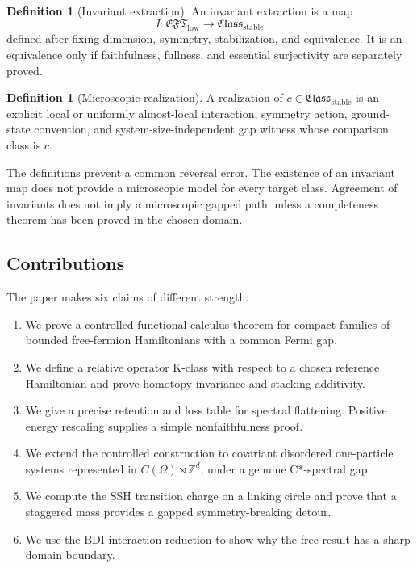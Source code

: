 \documentclass[12pt]{article}
\theoremstyle{definition}
\newtheorem{definition}[theorem]{Definition}
\theoremstyle{remark}
\newcommand{\EFT}{\mathfrak{EFT}}
\newcommand{\Class}{\mathfrak{Class}}
\newcommand{\Z}{\mathbb Z}
\begin{document}
\begin{definition}[Invariant extraction]
An invariant extraction is a map
\[
I:\EFT_{\mathrm{low}}\longrightarrow\Class_{\mathrm{stable}}
\]
defined after fixing dimension, symmetry, stabilization, and equivalence.
It is an equivalence only if faithfulness, fullness, and essential
surjectivity are separately proved.
\end{definition}

\begin{definition}[Microscopic realization]
A realization of $c\in\Class_{\mathrm{stable}}$ is an explicit local or
uniformly almost-local interaction, symmetry action, ground-state convention,
and system-size-independent gap witness whose comparison class is $c$.
\end{definition}

The definitions prevent a common reversal error.
The existence of an invariant map does not provide a microscopic model for
every target class.
Agreement of invariants does not imply a microscopic gapped path unless a
completeness theorem has been proved in the chosen domain.

\subsection{Contributions}

The paper makes six claims of different strength.

\begin{enumerate}[label=\arabic*.]
  \item We prove a controlled functional-calculus theorem for compact
  families of bounded free-fermion Hamiltonians with a common Fermi gap.

  \item We define a relative operator K-class with respect to a chosen
  reference Hamiltonian and prove homotopy invariance and stacking
  additivity.

  \item We give a precise retention and loss table for spectral flattening.
  Positive energy rescaling supplies a simple nonfaithfulness proof.

  \item We extend the controlled construction to covariant disordered
  one-particle systems represented in
  $C(\Omega)\rtimes\Z^d$, under a genuine C*-spectral gap.

  \item We compute the SSH transition charge on a linking circle and prove
  that a staggered mass provides a gapped symmetry-breaking detour.

  \item We use the BDI interaction reduction to show why the free result has
  a sharp domain boundary.
\end{enumerate}
\end{document}
